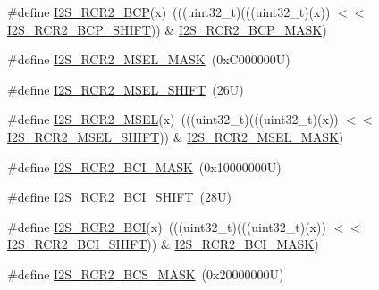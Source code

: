 \begin{DoxyCompactItemize}
\#define \mbox{\hyperlink{group___i2_s___register___masks_ga23b80ac02d7cc3a6fe56f551f4523d1b}{I2\+S\+\_\+\+R\+C\+R2\+\_\+\+B\+CP}}(x)~(((uint32\+\_\+t)(((uint32\+\_\+t)(x)) $<$$<$ \mbox{\hyperlink{group___i2_s___register___masks_ga5ab6e46c9fe897adc5d9205c5eed1af4}{I2\+S\+\_\+\+R\+C\+R2\+\_\+\+B\+C\+P\+\_\+\+S\+H\+I\+FT}})) \& \mbox{\hyperlink{group___i2_s___register___masks_ga2131afd85c44b3770c4f13aa313255d7}{I2\+S\+\_\+\+R\+C\+R2\+\_\+\+B\+C\+P\+\_\+\+M\+A\+SK}})
\item 
\#define \mbox{\hyperlink{group___i2_s___register___masks_gaedf6545e7c28305ad5d4b65a439db838}{I2\+S\+\_\+\+R\+C\+R2\+\_\+\+M\+S\+E\+L\+\_\+\+M\+A\+SK}}~(0x\+C000000\+U)
\item 
\#define \mbox{\hyperlink{group___i2_s___register___masks_gad12cb75f50dddf2a5364e04a0ec59b83}{I2\+S\+\_\+\+R\+C\+R2\+\_\+\+M\+S\+E\+L\+\_\+\+S\+H\+I\+FT}}~(26\+U)
\item 
\#define \mbox{\hyperlink{group___i2_s___register___masks_gae884163868d00afe144cc15cfd48936b}{I2\+S\+\_\+\+R\+C\+R2\+\_\+\+M\+S\+EL}}(x)~(((uint32\+\_\+t)(((uint32\+\_\+t)(x)) $<$$<$ \mbox{\hyperlink{group___i2_s___register___masks_gad12cb75f50dddf2a5364e04a0ec59b83}{I2\+S\+\_\+\+R\+C\+R2\+\_\+\+M\+S\+E\+L\+\_\+\+S\+H\+I\+FT}})) \& \mbox{\hyperlink{group___i2_s___register___masks_gaedf6545e7c28305ad5d4b65a439db838}{I2\+S\+\_\+\+R\+C\+R2\+\_\+\+M\+S\+E\+L\+\_\+\+M\+A\+SK}})
\item 
\#define \mbox{\hyperlink{group___i2_s___register___masks_ga38210c72a39c29ee6ce38ff654c471cb}{I2\+S\+\_\+\+R\+C\+R2\+\_\+\+B\+C\+I\+\_\+\+M\+A\+SK}}~(0x10000000\+U)
\item 
\#define \mbox{\hyperlink{group___i2_s___register___masks_gae2c819f98fdcd09a87ed34dd47b5fb4b}{I2\+S\+\_\+\+R\+C\+R2\+\_\+\+B\+C\+I\+\_\+\+S\+H\+I\+FT}}~(28\+U)
\item 
\#define \mbox{\hyperlink{group___i2_s___register___masks_gada2224148c3142c45e740da7c06f07a9}{I2\+S\+\_\+\+R\+C\+R2\+\_\+\+B\+CI}}(x)~(((uint32\+\_\+t)(((uint32\+\_\+t)(x)) $<$$<$ \mbox{\hyperlink{group___i2_s___register___masks_gae2c819f98fdcd09a87ed34dd47b5fb4b}{I2\+S\+\_\+\+R\+C\+R2\+\_\+\+B\+C\+I\+\_\+\+S\+H\+I\+FT}})) \& \mbox{\hyperlink{group___i2_s___register___masks_ga38210c72a39c29ee6ce38ff654c471cb}{I2\+S\+\_\+\+R\+C\+R2\+\_\+\+B\+C\+I\+\_\+\+M\+A\+SK}})
\item 
\#define \mbox{\hyperlink{group___i2_s___register___masks_gae4983d1c1366069cf6e768f5fefe84ff}{I2\+S\+\_\+\+R\+C\+R2\+\_\+\+B\+C\+S\+\_\+\+M\+A\+SK}}~(0x20000000\+U)
\item 
$$
\end{DoxyCompactItemize}
